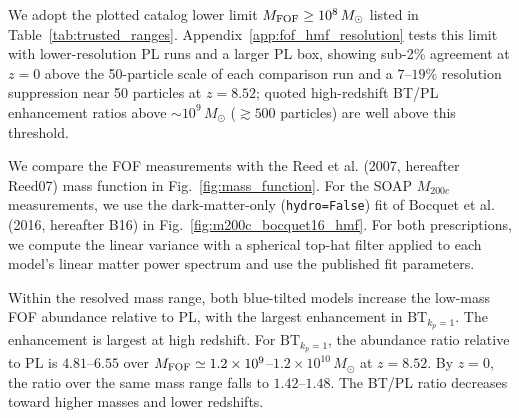 \documentclass[
 reprint,
 superscriptaddress,
 nofootinbib,
 nobibnotes,
 amsmath,
 amssymb,
 aps,
 prd,
 floatfix,
 longbibliography
]{revtex4-2}
\DeclareRobustCommand{\change}[1]{#1}
\DeclareRobustCommand{\BTKPone}{\ensuremath{\mathrm{BT}_{k_p=1}}}
\DeclareRobustCommand{\BTKPten}{\ensuremath{\mathrm{BT}_{k_p=10}}}
\begin{document}
We adopt the plotted catalog lower limit \(M_{\rm FOF}\ge10^8\,M_\odot\) listed in Table~\ref{tab:trusted_ranges}. Appendix~\ref{app:fof_hmf_resolution} tests this limit with lower-resolution PL runs and a larger PL box, showing sub-2\% agreement at \(z=0\) above the 50-particle scale of each comparison run and a \(7\)--\(19\%\) resolution suppression near 50 particles at \(z=8.52\); quoted high-redshift BT/PL enhancement ratios above \(\sim10^9\,M_\odot\) (\(\gtrsim500\) particles) are well above this threshold.


\change{We compare the FOF measurements with the Reed et al. (2007, hereafter Reed07) mass function \citep{Reed_2007} in Fig.~\ref{fig:mass_function}. For the SOAP \(M_{200c}\) measurements, we use the dark-matter-only (\texttt{hydro=False}) fit of Bocquet et al. (2016, hereafter B16) \citep{Bocquet2016} in Fig.~\ref{fig:m200c_bocquet16_hmf}. For both prescriptions, we compute the linear variance with a spherical top-hat filter applied to each model's linear matter power spectrum and use the published fit parameters.}

Within the resolved mass range, both blue-tilted models increase the low-mass FOF abundance relative to PL, with the largest enhancement in \BTKPone{}. The enhancement is largest at high redshift. For \BTKPone{}, the abundance ratio relative to PL is \(4.81\)--\(6.55\) over \(M_{\rm FOF}\simeq1.2\times10^9\)--\(1.2\times10^{10}\,M_\odot\) at \(z=8.52\). By \(z=0\), the ratio over the same mass range falls to \(1.42\)--\(1.48\). The BT/PL ratio decreases toward higher masses and lower redshifts.


\end{document}
